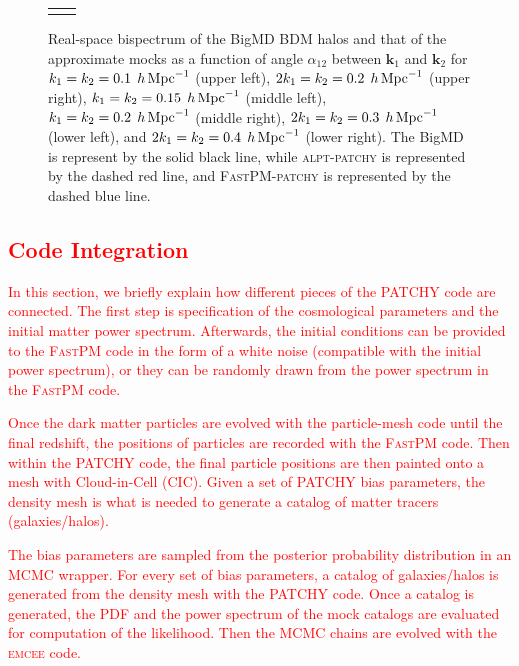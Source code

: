 \documentclass[english,usenatbib]{mn2e}
\newcommand{\tod}[1]{{\textcolor{red}{ #1}}}
\newcommand{\hperm}{\,h\,{\rm Mpc}^{-1}}
\begin{document}
\begin{figure}
\begin{tabular}{cc}
\vspace{-0.25cm}
\end{tabular}
\caption{\label{fig:bispec} Real-space bispectrum of the BigMD BDM halos and that of the approximate mocks as a function of angle $\alpha_{12}$ between $\mathbf{k}_1$ and $\mathbf{k}_{2}$ for $k_{1}=k_{2}=0.1\; \hperm$ (upper left), $2k_{1}=k_{2}=0.2\; \hperm$ (upper right), $k_{1}=k_{2}=0.15\; \hperm$ (middle left), $k_{1}=k_{2}=0.2\; \hperm$ (middle right), $2k_{1}=k_{2}=0.3\; \hperm$ (lower left), and $2k_{1}=k_{2}=0.4\; \hperm$ (lower right). The BigMD is represent by the solid black line, while \textsc{alpt}-\textsc{patchy} is represented by the dashed red line, and \textsc{FastPM}-\textsc{patchy} is represented by the dashed blue line.}
\end{figure}

\tod{\section{Code Integration}}
\tod{In this section, we briefly explain how different pieces of the \textsc{PATCHY} code are connected. The first step is specification of the cosmological parameters and the initial matter power spectrum. Afterwards, the initial conditions can be provided to the \textsc{FastPM} code in the form of a white noise (compatible with the initial power spectrum), or they can be randomly drawn from the power spectrum in the \textsc{FastPM} code.}

\tod{Once the dark matter particles are evolved with the particle-mesh code until the final redshift, the positions of particles are recorded with the \textsc{FastPM} code. Then within the \textsc{PATCHY} code, the final particle positions are then painted onto a mesh with Cloud-in-Cell (CIC). Given a set of \textsc{PATCHY} bias parameters, the density mesh is what is needed to generate a catalog of matter tracers (galaxies/halos).}

\tod{The bias parameters are sampled from the posterior probability distribution in an MCMC wrapper. For every set of bias parameters, a catalog of galaxies/halos is generated from the density mesh with the \textsc{PATCHY} code. Once a catalog is generated, the PDF and the power spectrum of the mock catalogs are evaluated for computation of the likelihood. Then the MCMC chains are evolved with the \textsc{emcee} code.}
\end{document}
